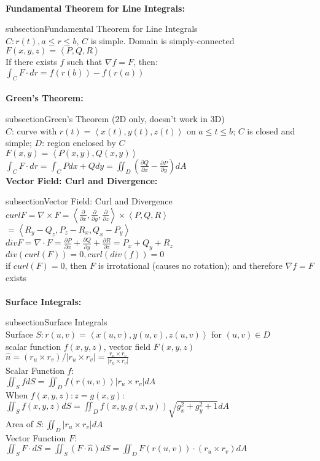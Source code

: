 \documentclass{article}
\newcommand{\zzz}[1]{\0 {\textbf{#1:}} \addcontentsline{toc} {subsection}{#1}}
\newcommand{\ang}[1]{\left\langle #1 \right\rangle}
\newcommand{\prt}[2]{\frac{\partial#1}{\partial#2}}
\newcommand{\grad}{\nabla}
\begin{document}
\begin{multicols*}{2}
\begin{outline}[compactitem]
\\
\zzz{Fundamental Theorem for Line Integrals}
\\ $C: r(t), a\leq r \leq b$, $C$ is simple. Domain is simply-connected
\\ $F(x,y,z) = \ang{P,Q,R}$
\\ If there exists $f$ such that $\grad f = F$, then:
\\ $\int_C F \cdot dr = f(r(b)) - f(r(a))$
\\
\\
\zzz{Green's Theorem} (2D only, doesn't work in 3D)
\\ $C$: curve with $r(t) = \ang{x(t),y(t),z(t)} $ on $a\leq t\leq b$; $C$ is closed and simple; $D$: region enclosed by $C$
\\ $F(x,y) = \ang{P(x,y),Q(x,y)}$
\\ $\int_C F\cdot dr = \int_C Pdx + Qdy = \iint_D \left(\prt{Q}{x} - \prt{P}{y} \right) dA $
\\\zzz{Vector Field: Curl and Divergence}
\\ $curlF = \nabla\times F = \ang{\prt{}{x}, \prt{}{y}, \prt{}{z}}\times\ang{P,Q,R}$
\\ $= \ang{R_y-Q_z, P_z-R_x, Q_x-P_y}$
\\ $divF = \nabla\cdot F =  \prt{P}{x}+\prt{Q}{y}+\prt{R}{z} = P_x+Q_y+R_z$
\\ $div(curl(F)) = 0, curl(div(f)) = 0$
\\ if $curl(F) = 0$, then $F$ is irrotational (causes no rotation); and therefore $\nabla f = F$ exists
\\
\\
\zzz{Surface Integrals}
\\ Surface $S: r(u,v)=\ang{x(u,v), y(u,v), z(u,v)}$ for $(u,v) \in D$
\\ scalar function $f(x,y,z)$, vector field $F(x,y,z)$
\\ $\hat{n} = (r_u\times r_v)/|r_u\times r_v| = \frac{r_u\times r_v}{|r_u\times r_v|}$
\\ Scalar Function $f$:
\\ $\iint_S f dS = \iint_D f(r(u,v))|r_u\times r_v|dA$
\\ When $f(x,y,z): z=g(x,y)$: 
	\\ $\iint_S f(x,y,z)dS = \iint_D f(x,y,g(x,y))\sqrt{g_x^2 + g_y^2 + 1}dA$ 
\\ Area of $S: \iint_D |r_u\times r_v|dA$
\\ Vector Function $F$:
\\ $\iint_S F \cdot dS = \iint_S (F\cdot\hat{n})dS = \iint_D F(r(u,v))\cdot(r_u\times r_v) dA$

\end{outline}
\end{multicols*}
\end{document}

